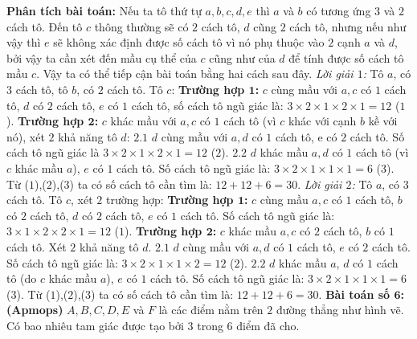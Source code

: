 \begin{multicols}{2}
		\textbf{\color{toancuabi}Phân tích bài toán:} Nếu ta tô thứ tự $a,b,c,d,e$ thì $a$ và $b$ có tương ứng $3$ và $2$ cách tô. Đến tô $c$ thông thường sẽ có $2$ cách tô, $d$ cũng $2$ cách tô, nhưng nếu như vậy thì $e$ sẽ không xác định được số cách tô vì nó phụ thuộc vào $2$ cạnh $a$ và $d$, bởi vậy ta cần xét đến mầu cụ thể của $c$ cũng như của $d$ để tính được số cách tô mầu $c$. Vậy ta có thể tiếp cận bài toán bằng hai cách sau đây.
		\vskip 0.1cm
		\textit{Lời giải $1$:}
		\vskip 0.1cm
		Tô $a$, có $3$ cách tô, tô $b$, có $2$ cách tô.
		\vskip 0.1cm
		Tô $c$:
		\vskip 0.1cm
		\textbf{\color{toancuabi}Trường hợp $\pmb{1}$:} $c$ cùng mầu với $a, c$ có $1$ cách tô, $d$ có $2$ cách tô, $e$ có $1$ cách tô, số cách tô ngũ giác là: $3\times2\times1\times2\times1=12$ ($1$).
		\vskip 0.1cm
		\textbf{\color{toancuabi}Trường hợp $\pmb{2}$:} $c$ khác mầu với $a, c$ có $1$ cách tô (vì $c$ khác với cạnh $b$ kề với nó), xét $2$ khả năng tô $d$:
		\vskip 0.1cm
		$2.1$ $d$ cùng mầu với $a, d$ có $1$ cách tô, e có $2$ cách tô. Số cách tô ngũ giác là $3\times2\times1\times2\times1=12$ ($2$).
		\vskip 0.1cm
		$2.2$ $d$ khác mầu $a, d$ có $1$ cách tô (vì $c$ khác mầu $a$), $e$ có $1$ cách tô. Số cách tô ngũ giác là: $3\times2\times1\times1\times1=6$ ($3$).
		\vskip 0.1cm
		Từ ($1$),($2$),($3$) ta có số cách tô cần tìm là: $12+12+6=30$.
	\vskip 0.1cm
	\textit{Lời giải $2$:}
	\vskip 0.1cm
	Tô $a$, có $3$ cách tô. Tô $c$, xét $2$ trường hợp:
	\vskip 0.1cm
	\textbf{\color{toancuabi}Trường hợp $\pmb{1}$:} $c$ cùng mầu $a, c$ có $1$ cách tô, $b$ có $2$ cách tô, $d$ có $2$ cách tô, $e$ có $1$ cách tô. Số cách tô ngũ giác là: $3\times1\times2\times2\times1=12$ ($1$).
	\vskip 0.1cm
	\textbf{\color{toancuabi}Trường hợp $\pmb{2}$:} $c$ khác mầu $a, c$ có $2$ cách tô, $b$ có $1$ cách tô. Xét $2$ khả năng tô $d$.
	\vskip 0.1cm
	$2.1$ $d$ cùng mầu với $a, d$ có $1$ cách tô, $e$ có $2$ cách tô. Số cách tô ngũ giác là: $3\times2\times1\times1\times2=12$ ($2$).
	\vskip 0.1cm
	$2.2$ $d$ khác mầu $a$, $d$ có $1$ cách tô (do $c$ khác mầu $a$), $e$ có $1$ cách tô. Số cách tô ngũ giác là: $3\times2\times1\times1\times1=6$ ($3$).
	\vskip 0.1cm
	Từ ($1$),($2$),($3$) ta có số cách tô cần tìm là: $12+12+6=30$.
	\vskip 0.1cm
		\textbf{\color{toancuabi}Bài toán số $\pmb{6}$: (Apmops)}
		\vskip 0.1cm
		$A,B,C,D,E$ và $F$ là các điểm nằm trên $2$ đường thẳng như hình vẽ. Có bao nhiêu tam giác được tạo bởi $3$ trong $6$ điểm đã cho.
		\begin{figure}[H]
			\centering
			\vspace*{-5pt}
			\captionsetup{labelformat=empty, justification=centering}

\end{figure}
\end{multicols}
